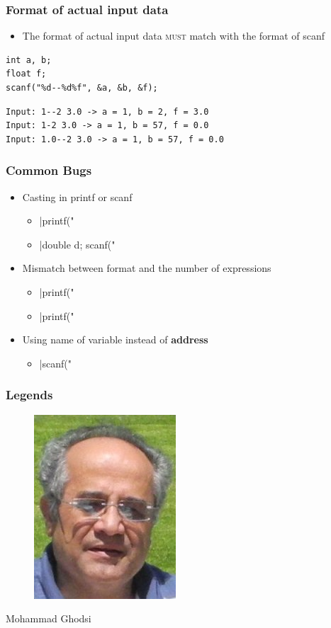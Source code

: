 \documentclass{../c-lecture}
\begin{document}
\begin{frame}[fragile]
  \frametitle{Format of actual input data}
  \begin{itemize}
    \item
      The format of actual input data \textsc{\color{YellowOrange} must} match
      with the format of scanf

  \end{itemize}
  \begin{verbatim}
int a, b;
float f;
scanf("%d--%d%f", &a, &b, &f);
  \end{verbatim}
  \begin{verbatim}
Input: 1--2 3.0 -> a = 1, b = 2, f = 3.0
Input: 1-2 3.0 -> a = 1, b = 57, f = 0.0
Input: 1.0--2 3.0 -> a = 1, b = 57, f = 0.0
  \end{verbatim}
\end{frame}

\begin{frame}[fragile]
  \frametitle{Common Bugs}
  \begin{itemize}
    \item Casting in printf or scanf
    \begin{itemize}
      \item {}|printf("%
      \item {}|double d; scanf("%
    \end{itemize}
    \item Mismatch between format and the number of expressions
    \begin{itemize}
      \item {}|printf("%
      \item {}|printf("%
    \end{itemize}
    \item
      Using name of variable instead of \textbf{\color{Orange} address}
    \begin{itemize}
      \item {}|scanf("%
    \end{itemize}
  \end{itemize}
\end{frame}

\begin{frame}
  \frametitle{Legends}
  \begin{figure}
    \includegraphics[height=.75\textheight]{./img/ghodsi.jpg}
  \end{figure}
  \pause%
  \centering
  \color{Violet} Mohammad Ghodsi
\end{frame}
\end{document}
